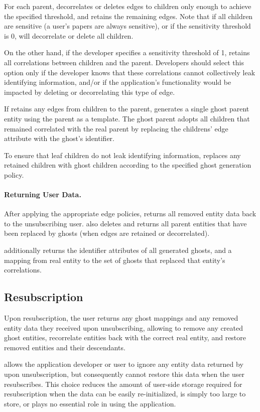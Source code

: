 For each parent, \sys decorrelates or deletes edges to children only enough to achieve the specified
threshold, and retains the remaining edges. Note that if all children are sensitive (a user's papers
are always sensitive), or if the sensitivity threshold is 0, \sys will decorrelate or delete all
children. 

On the other hand, if the developer specifies a sensitivity threshold of 1, \sys retains all
correlations between children and the parent. Developers should select this option only if the
developer knows that these correlations cannot collectively leak identifying information, and/or if
the application's functionality would be impacted by deleting or decorrelating this type of edge.

If \sys retains any edges from children to the parent, \sys generates a single ghost parent entity using the
parent as a template. The ghost parent adopts all children that remained correlated with the real
parent by replacing the childrens' edge attribute with the ghost's identifier.

To ensure that leaf children do not leak identifying information, 
\sys replaces any retained children with ghost children according to the specified ghost generation
policy.

\paragraph{Returning User Data.}
After applying the appropriate edge policies, \sys returns all 
removed entity data back to the unsubscribing user. \sys also deletes and returns all parent entities that
have been replaced by ghosts (when edges are retained or decorrelated).

\sys additionally returns the identifier attributes of all generated ghosts, and a mapping from real
entity to the set of ghosts that replaced that entity's correlations. 

\subsection{Resubscription}
Upon resubscription, the user returns any ghost mappings and any removed entity data they received
upon unsubscribing, allowing \sys to remove any created ghost entities, recorrelate entities back
with the correct real entity, and restore removed entities and their descendants. 

\sys allows the application developer or user to ignore any entity data returned by \sys upon
unsubscription, but consequently cannot restore this data when the user resubscribes.  This choice
reduces the amount of user-side storage required for resubscription when the data can be easily
re-initialized, is simply too large to store, or plays no essential role in using the application.

